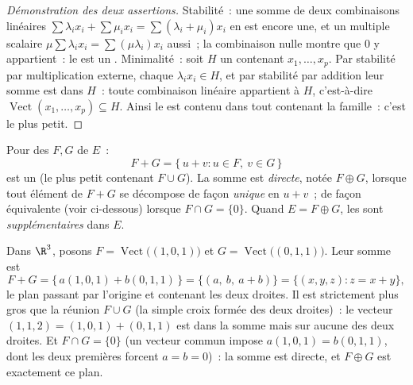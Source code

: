 \begin{proof}[Démonstration des deux assertions]
Stabilité~: une somme de deux combinaisons linéaires
$\sum\lambda_i x_i + \sum\mu_i x_i = \sum(\lambda_i + \mu_i)x_i$ en
est encore une, et un multiple scalaire
$\mu\sum\lambda_i x_i = \sum(\mu\lambda_i) x_i$ aussi~; la
combinaison nulle montre que $0$ y appartient~: le  est un . Minimalité~: soit $H$ un 
contenant $x_1, \dots, x_p$. Par stabilité par multiplication externe,
chaque $\lambda_i x_i \in H$, et par stabilité par addition leur somme
est dans $H$~: toute combinaison linéaire appartient à $H$, c'est-à-dire
$\operatorname{Vect}(x_1, \dots, x_p) \subseteq H$. Ainsi le
 est contenu dans tout  contenant la
famille~: c'est le plus petit.
\end{proof}

\begin{definition}\label{def:b1:vspaces:sum}
Pour des  $F, G$ de $E$~:
\[
F + G = \{\,u + v : u \in F,\ v \in G\,\}
\]
est un  (le plus petit contenant $F \cup G$). La somme est
\emph{directe}, notée $F \oplus G$, lorsque tout
élément de $F + G$ se décompose de façon \emph{unique} en $u + v$~;
de façon équivalente (voir ci-dessous) lorsque $F \cap G = \{0\}$.
Quand $E = F \oplus G$, les  sont
\emph{supplémentaires} dans $E$.
\end{definition}

\begin{example}
\label{ex:b1:vspaces:sumoflines}
Dans $\R^3$, posons $F = \operatorname{Vect}\bigl((1,0,1)\bigr)$ et
$G = \operatorname{Vect}\bigl((0,1,1)\bigr)$. Leur somme est
\[
F + G = \{\,a(1,0,1) + b(0,1,1)\,\}
= \{(a,\ b,\ a + b)\} = \{(x, y, z) : z = x + y\},
\]
le plan passant par l'origine et contenant les deux droites. Il est
strictement plus gros que la réunion $F \cup G$ (la simple croix
formée des deux droites)~: le vecteur $(1, 1, 2) = (1,0,1) + (0,1,1)$
est dans la somme mais sur aucune des deux droites. Et $F \cap G =
\{0\}$ (un vecteur commun impose $a(1,0,1) = b(0,1,1)$, dont les deux
premières  forcent $a = b = 0$)~: la somme est directe, et
$F \oplus G$ est exactement ce plan.
\end{example}

